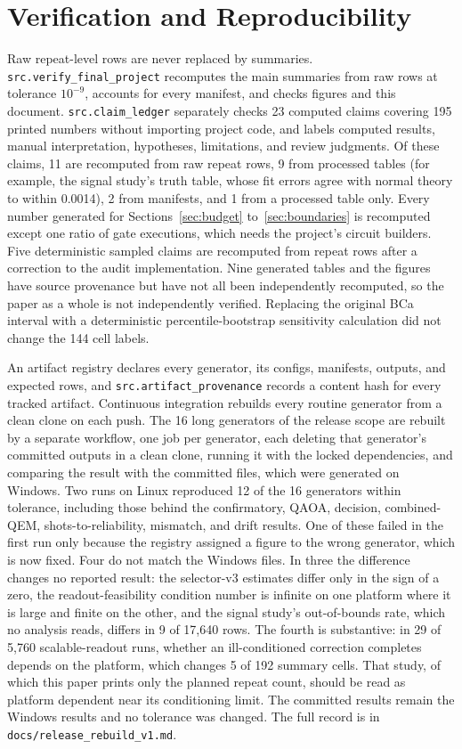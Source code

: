 \documentclass[10pt,twocolumn]{article}
\begin{document}
\section{Verification and Reproducibility}
\label{sec:verification}
Raw repeat-level rows are never replaced by summaries. \texttt{src.verify\_final\_project}
recomputes the main summaries from raw rows at tolerance $10^{-9}$, accounts for every manifest, and
checks figures and this document. \texttt{src.claim\_ledger} separately checks 23 computed claims
covering 195 printed numbers without importing project code, and labels computed results, manual
interpretation, hypotheses, limitations, and review judgments. Of these claims, 11 are recomputed from
raw repeat rows, 9 from processed tables (for example, the signal study's truth table, whose fit
errors agree with normal theory to within 0.0014), 2 from manifests, and 1 from a processed table
only. Every number generated for Sections~\ref{sec:budget} to~\ref{sec:boundaries} is recomputed
except one ratio of gate executions, which needs the project's circuit builders. Five
deterministic sampled claims are recomputed from repeat rows after a correction to the audit
implementation. Nine generated tables and the figures have source provenance but have not all been
independently recomputed, so the paper as a whole is not independently verified.
Replacing the original BCa interval with a deterministic percentile-bootstrap sensitivity
calculation did not change the 144 cell labels.

An artifact registry declares every generator, its configs, manifests, outputs, and expected rows,
and \texttt{src.artifact\_provenance} records a content hash for every tracked artifact.
Continuous integration rebuilds every routine generator from a clean clone on each push. The 16
long generators of the release scope are rebuilt by a separate workflow, one job per generator, each
deleting that generator's committed outputs in a clean clone, running it with the locked
dependencies, and comparing the result with the committed files, which were generated on Windows.
Two runs on Linux reproduced 12 of the 16 generators within tolerance, including those behind the
confirmatory, QAOA, decision, combined-QEM, shots-to-reliability, mismatch, and drift results. One
of these failed in the first run only because the registry assigned a figure to the wrong generator,
which is now fixed. Four do not match the Windows files. In three the difference changes no reported result:
the selector-v3 estimates differ only in the sign of a zero, the readout-feasibility condition number
is infinite on one platform where it is large and finite on the other, and the signal study's
out-of-bounds rate, which no analysis reads, differs in 9 of 17,640 rows. The fourth is substantive:
in 29 of 5,760 scalable-readout runs, whether an ill-conditioned correction completes depends on the
platform, which changes 5 of 192 summary cells. That study, of which this paper prints only the
planned repeat count, should be read as platform dependent near its conditioning limit. The
committed results remain the Windows results and no tolerance was changed. The full
record is in \texttt{docs/release\_rebuild\_v1.md}.
\end{document}

